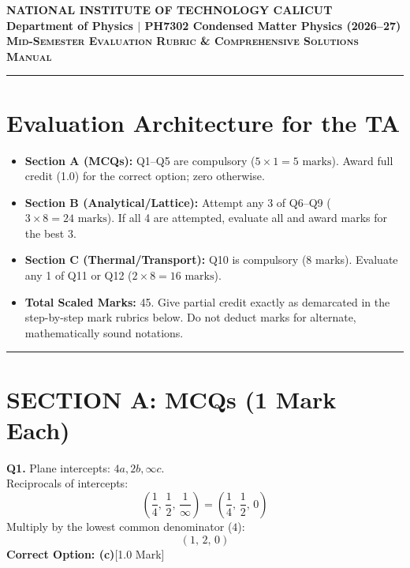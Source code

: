 \documentclass[10pt,a4paper,twocolumn]{article}
\begin{document}
\begin{center}
    {\large \textbf{NATIONAL INSTITUTE OF TECHNOLOGY CALICUT}}\\[2pt]
    {\normalsize \textbf{Department of Physics \quad $\vert$ \quad PH7302 Condensed Matter Physics (2026--27)}}\\[2pt]
    {\bfseries \scshape Mid-Semester Evaluation Rubric \& Comprehensive Solutions Manual}
\end{center}

\vspace{-0.5em}
\hrule
\vspace{0.8em}

\section*{Evaluation Architecture for the TA}
\begin{itemize}
    \item \textbf{Section A (MCQs):} Q1--Q5 are compulsory ($5 \times 1 = 5\text{ marks}$). Award full credit (1.0) for the correct option; zero otherwise.
    \item \textbf{Section B (Analytical/Lattice):} Attempt any 3 of Q6--Q9 ($3 \times 8 = 24\text{ marks}$). If all 4 are attempted, evaluate all and award marks for the best 3.
    \item \textbf{Section C (Thermal/Transport):} Q10 is compulsory (8 marks). Evaluate any 1 of Q11 or Q12 ($2 \times 8 = 16\text{ marks}$).
    \item \textbf{Total Scaled Marks:} 45. Give partial credit exactly as demarcated in the step-by-step mark rubrics below. Do not deduct marks for alternate, mathematically sound notations.
\end{itemize}

\vspace{-0.3em}
\hrule
\vspace{0.6em}

\section*{SECTION A: MCQs (1 Mark Each)}

\textbf{Q1.} Plane intercepts: $4a, 2b, \infty c$.\\[2pt]
Reciprocals of intercepts:
$$\left(\frac{1}{4}, \, \frac{1}{2}, \, \frac{1}{\infty}\right) = \left(\frac{1}{4}, \, \frac{1}{2}, \, 0\right)$$
Multiply by the lowest common denominator ($4$):
$$\left(1, \, 2, \, 0\right)$$
\textbf{Correct Option: (c)}\hfill [1.0 Mark]
\end{document}
